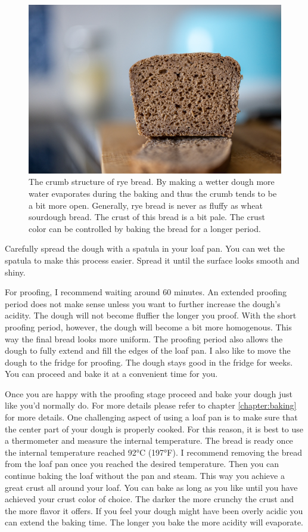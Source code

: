 \begin{figure}[!htb]
  \includegraphics[width=\textwidth]{crumb}
  \caption{The crumb structure of rye bread. By making a wetter
  dough more water evaporates during the baking and thus the
  crumb tends to be a bit more open. Generally, rye
  bread is never as fluffy as wheat sourdough bread. The crust
  of this bread is a bit pale. The crust color can be controlled
  by baking the bread for a longer period.}
  \label{fig:rye-crumb}
\end{figure}

Carefully spread the dough with a spatula in your loaf pan. You
can wet the spatula to make this process easier. Spread it
until the surface looks smooth and shiny.

For proofing, I recommend waiting around 60 minutes. An extended
proofing period does not make sense unless you want to further
increase the dough's acidity. The dough will not become fluffier
the longer you proof. With the short proofing period, however,
the dough will become a bit more homogenous. This way the final
bread looks more uniform. The proofing period also allows the
dough to fully extend and fill the edges of the loaf pan. I also
like to move the dough to the fridge for proofing. The dough stays
good in the fridge for weeks. You can proceed and bake it at a
convenient time for you. 

Once you are happy with the proofing stage proceed and bake your dough
just like you'd normally do. For more details please refer to chapter
\ref{chapter:baking} for more details. One challenging aspect
of using a loaf pan is to make sure that the center part of your
dough is properly cooked. For this reason, it is best to use a thermometer
and measure the internal temperature. The bread is
ready once the internal temperature reached 92°C (197°F). I recommend
removing the bread from the loaf pan once you reached the desired
temperature. Then you can continue baking the loaf without the pan and
steam. This way you achieve a great crust all around your
loaf. You can bake as long as you like until you have achieved
your crust color of choice. The darker the more crunchy
the crust and the more flavor it offers. If you feel your
dough might have been overly acidic you can extend the baking time.
The longer you bake the more acidity will evaporate.

